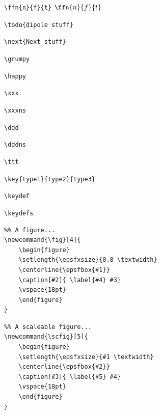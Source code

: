 \verb*+\ffn{n}{f}{t}+ $\ffn{n}{f}{t}$





\verb*+\todo{dipole stuff}+ 


\verb*+\next{Next stuff}+ 



\verb*+\grumpy+ \grumpy

\verb*+\happy+ \happy



\verb*+\xxx+ \xxx



\verb*+\xxxns+ \xxxns



\verb*+\ddd+ \ddd



\verb*+\dddns+ \dddns



\verb*+\ttt+ \ttt



\verb*+\key{type1}{type2}{type3}+ 


\verb*+\keydef+ \keydef


\verb*+\keydefs+ \keydefs


\begin{verbatim}
%% A figure...
\newcommand{\fig}[4]{
	\begin{figure}
	\setlength{\epsfxsize}{0.8 \textwidth}
	\centerline{\epsfbox{#1}}
	\caption[#2]{ \label{#4} #3}
	\vspace{18pt}
	\end{figure}
}
\end{verbatim}

\begin{verbatim}
%% A scaleable figure...
\newcommand{\scfig}[5]{
	\begin{figure}
	\setlength{\epsfxsize}{#1 \textwidth}
	\centerline{\epsfbox{#2}}
	\caption[#3]{ \label{#5} #4}
	\vspace{18pt}
	\end{figure}
}
\end{verbatim}

